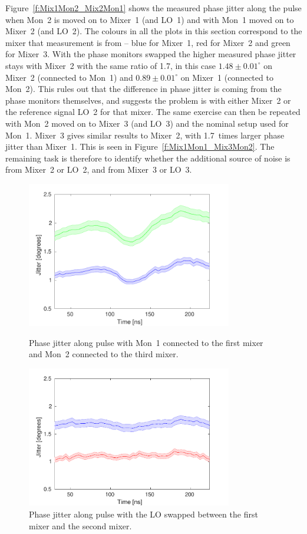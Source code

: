 Figure~\ref{f:Mix1Mon2_Mix2Mon1} shows the measured phase jitter along the pulse when Mon~2 is moved on to Mixer~1 (and LO~1) and with Mon~1 moved on to Mixer~2 (and LO~2). The colours in all the plots in this section correspond to the mixer that measurement is from -- blue for Mixer~1, red for Mixer~2 and green for Mixer~3. With the phase monitors swapped the higher measured phase jitter stays with Mixer~2 with the same ratio of 1.7, in this case \(1.48\pm0.01^\circ\) on Mixer~2 (connected to Mon~1) and \(0.89\pm0.01^\circ\) on Mixer~1 (connected to Mon~2). This rules out that the difference in phase jitter is coming from the phase monitors themselves, and suggests the problem is with either Mixer~2 or the reference signal LO~2 for that mixer. The same exercise can then be repeated with Mon~2 moved on to Mixer~3 (and LO~3) and the nominal setup used for Mon~1. Mixer~3 gives similar results to Mixer~2, with 1.7~times larger phase jitter than Mixer~1. This is seen in Figure~\ref{f:Mix1Mon1_Mix3Mon2}. The remaining task is therefore to identify whether the additional source of noise is from Mixer~2 or LO~2, and from Mixer~3 or LO~3.

\begin{figure}
  \centering
  \includegraphics[width=0.8\textwidth]{Figures/phaseMons/Mix1Mon1_Mix3Mon2}
  \caption{Phase jitter along pulse with Mon~1 connected to the first mixer and Mon~2 connected to the third mixer.}
  \label{f:Mix1Mon1_Mix3Mon2}
  \includegraphics[width=0.8\textwidth]{Figures/phaseMons/Mix1Mon1PhShft2_Mix2Mon2PhShft1}
  \caption{Phase jitter along pulse with the LO swapped between the first mixer and the second mixer.}
  \label{f:Mix1Mon1PhShft2_Mix2Mon2PhShft1}
\end{figure}

